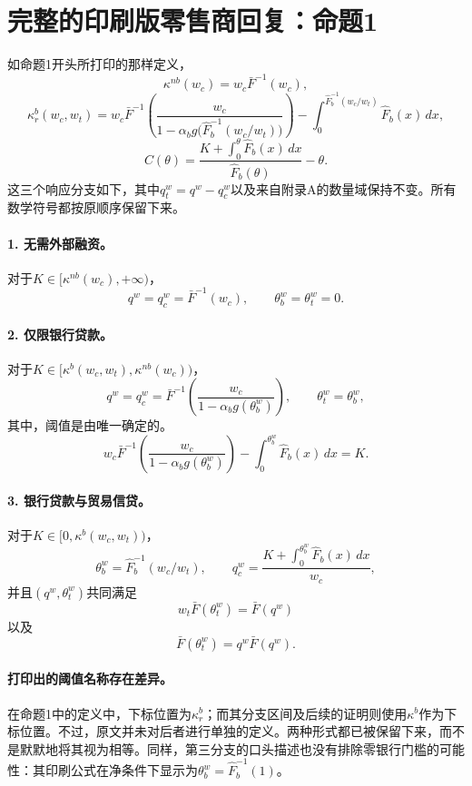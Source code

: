 \documentclass{article}
\begin{document}
\section*{完整的印刷版零售商回复：命题1}
如命题1开头所打印的那样定义，
\[
\kappa^{nb}(w_c)=w_c\bar F^{-1}(w_c),
\]
\[
\kappa_r^b(w_c,w_t)
=w_c\bar F^{-1}\!\left(
\frac{w_c}{1-\alpha_bg\bigl(\hat F_b^{-1}(w_c/w_t)\bigr)}
\right)
-\int_0^{\hat F_b^{-1}(w_c/w_t)}\hat F_b(x)\,dx,
\]
\[
C(\theta)=\frac{K+\displaystyle\int_0^{\theta}\hat F_b(x)\,dx}
{\hat F_b(\theta)}-\theta.
\]
这三个响应分支如下，其中$q_t^w=q^w-q_c^w$以及来自附录A的数量域保持不变。所有数学符号都按原顺序保留下来。

\paragraph{1. 无需外部融资。}
对于$K\in[\kappa^{nb}(w_c),+\infty)$，
\[
q^w=q_c^w=\bar F^{-1}(w_c),\qquad
\theta_b^w=\theta_t^w=0.
\]

\paragraph{2. 仅限银行贷款。}
对于$K\in[\kappa^b(w_c,w_t),\kappa^{nb}(w_c))$，
\[
q^w=q_c^w=\bar F^{-1}\!\left(
\frac{w_c}{1-\alpha_bg(\theta_b^w)}\right),
\qquad \theta_t^w=\theta_b^w,
\]
其中，阈值是由唯一确定的。
\begin{equation}
w_c\bar F^{-1}\!\left(\frac{w_c}{1-\alpha_bg(\theta_b^w)}\right)
-\int_0^{\theta_b^w}\hat F_b(x)\,dx=K.\tag{5}
\end{equation}

\paragraph{3. 银行贷款与贸易信贷。}
对于$K\in[0,\kappa^b(w_c,w_t))$，
\[
\theta_b^w=\hat F_b^{-1}(w_c/w_t),\qquad
q_c^w=\frac{K+\displaystyle\int_0^{\theta_b^w}\hat F_b(x)\,dx}{w_c},
\]
并且$(q^w,\theta_t^w)$共同满足
\[
w_t\bar F(\theta_t^w)=\bar F(q^w)
\]
以及
\begin{equation}
[\theta_t^w+C(\theta_b^w)]\bar F(\theta_t^w)
=q^w\bar F(q^w).\tag{6}
\end{equation}

\paragraph{打印出的阈值名称存在差异。}
在命题1中的定义中，下标位置为$\kappa_r^b$；而其分支区间及后续的证明则使用$\kappa^b$作为下标位置。不过，原文并未对后者进行单独的定义。两种形式都已被保留下来，而不是默默地将其视为相等。同样，第三分支的口头描述也没有排除零银行门槛的可能性：其印刷公式在净条件下显示为$\theta_b^w=\hat F_b^{-1}(1)$。
\end{document}
